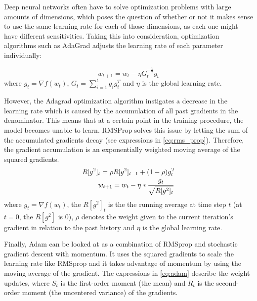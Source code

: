     Deep neural networks often have to solve optimization problems with large amounts of dimensions, which poses the question of whether or not it makes sense to use the same learning rate for each of those dimensions, as each one might have different sensitivities. Taking this into consideration, optimization algorithms such as AdaGrad \cite{adagrad} adjusts the learning rate of each parameter individually:
    
    \begin{equation}
        w_{t+1} = w_t - \eta G^{-\frac{1}{2}}_t g_t
        \label{eq:ada_grad}
    \end{equation}  
    where $g_t = \nabla f(w_t)$, $G_t=\sum_{i=1}^{t}g_i g_i^T$ and $\eta$ is the global learning rate.
    
    However, the Adagrad optimization algorithm instigates a decrease in the learning rate which is caused by the accumulation of all past gradients in the denominator. This means that at a certain point in the training procedure, the model becomes unable to learn. RMSProp solves this issue by letting the sum of the accumulated gradients decay (see expressions in \ref{eq:rms_prop}). Therefore, the gradient accumulation is an exponentially weighted moving average of the squared gradients.
    \begin{equation}
        \centering
        \begin{split}
            R[g^2]_t = \rho R[g^2]_{t-1} + (1-\rho)g_t^2\\
            w_{t+1} = w_t - \eta * \frac{g_t}{\sqrt{R[g^2]_t}} 
        \end{split}
        \label{eq:rms_prop}
    \end{equation}  
    where $g_t = \nabla f(w_t)$, the $R[g^2]_t$ is the the running average at time step $t$ (at $t=0$, the $R[g^2]$ is 0), $\rho$ denotes the weight given to the current iteration’s gradient in relation to the past history and $\eta$ is the global learning rate.
    
    Finally, Adam \cite{adam} can be looked at as a combination of RMSprop and stochastic gradient descent with momentum. It uses the squared gradients to scale the learning rate like RMSprop and it takes advantage of momentum by using the moving average of the gradient. The expressions in \ref{eq:adam} describe the weight updates, where $S_t$ is the first-order moment (the mean) and $R_t$ is the second-order moment (the uncentered variance) of the gradients. 
    
